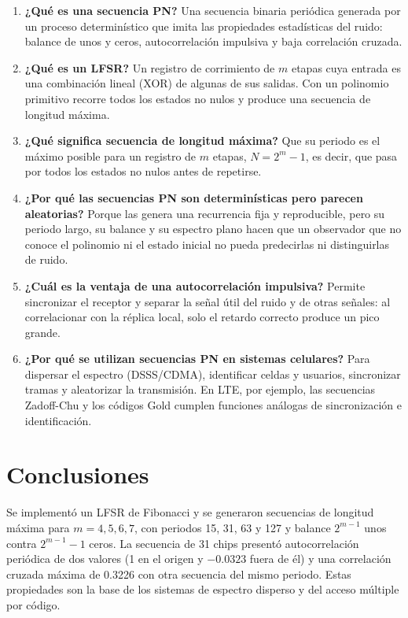 \documentclass[11pt,a4paper]{article}
\begin{document}
\begin{enumerate}
  \item \textbf{¿Qué es una secuencia PN?} Una secuencia binaria periódica generada por un
        proceso determinístico que imita las propiedades estadísticas del ruido: balance
        de unos y ceros, autocorrelación impulsiva y baja correlación cruzada.
  \item \textbf{¿Qué es un LFSR?} Un registro de corrimiento de $m$ etapas cuya entrada es
        una combinación lineal (XOR) de algunas de sus salidas. Con un polinomio primitivo
        recorre todos los estados no nulos y produce una secuencia de longitud máxima.
  \item \textbf{¿Qué significa secuencia de longitud máxima?} Que su periodo es el máximo
        posible para un registro de $m$ etapas, $N=2^m-1$, es decir, que pasa por todos
        los estados no nulos antes de repetirse.
  \item \textbf{¿Por qué las secuencias PN son determinísticas pero parecen aleatorias?}
        Porque las genera una recurrencia fija y reproducible, pero su periodo largo, su
        balance y su espectro plano hacen que un observador que no conoce el polinomio ni
        el estado inicial no pueda predecirlas ni distinguirlas de ruido.
  \item \textbf{¿Cuál es la ventaja de una autocorrelación impulsiva?} Permite sincronizar
        el receptor y separar la señal útil del ruido y de otras señales: al correlacionar
        con la réplica local, solo el retardo correcto produce un pico grande.
  \item \textbf{¿Por qué se utilizan secuencias PN en sistemas celulares?} Para dispersar
        el espectro (DSSS/CDMA), identificar celdas y usuarios, sincronizar tramas y
        aleatorizar la transmisión. En LTE, por ejemplo, las secuencias Zadoff-Chu y los
        códigos Gold cumplen funciones análogas de sincronización e identificación.
\end{enumerate}

\section{Conclusiones}

Se implementó un LFSR de Fibonacci y se generaron secuencias de longitud máxima para
$m=4,5,6,7$, con periodos 15, 31, 63 y 127 y balance $2^{m-1}$ unos contra
$2^{m-1}-1$ ceros. La secuencia de 31 chips presentó autocorrelación periódica de dos
valores (1 en el origen y $-0.0323$ fuera de él) y una correlación cruzada máxima de
0.3226 con otra secuencia del mismo periodo. Estas propiedades son la base de los
sistemas de espectro disperso y del acceso múltiple por código.
\end{document}
